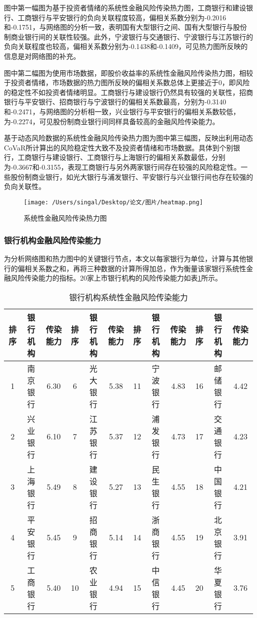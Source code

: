 \documentclass[lang=cn]{elegantpaper}
\begin{document}
图中第一幅图为基于投资者情绪的系统性金融风险传染热力图，工商银行和建设银行、工商银行与平安银行的负向关联程度较高，偏相关系数分别为-0.2016和-0.1751，与网络图的分析一致，表明国有大型银行之间、国有大型银行与股份制商业银行间的关联性较强。此外，宁波银行与交通银行、宁波银行与江苏银行的负向关联程度也较高，偏相关系数分别为-0.1438和-0.1409，可见热力图所反映的信息是对网络图的补充。

图中第二幅图为使用市场数据，即股价收益率的系统性金融风险传染热力图，相较于投资者情绪，市场数据的热力图所反映的偏相关系数总体上更接近于0，即风险的稳定性不如投资者情绪明显。工商银行与建设银行仍然具有较强的关联性，招商银行与平安银行、招商银行与宁波银行的偏相关系数最高，分别为-0.3140和-0.2471，与网络图的分析相一致，兴业银行与平安银行的偏相关系数较低，为-0.2274，可见股份制商业银行间同样具备较高的金融风险传染能力。

基于动态风险数据的系统性金融风险传染热力图为图中第三幅图，反映出利用动态CoVaR所计算出的风险稳定性大致不及投资者情绪和市场数据。具体到个别银行，工商银行与建设银行、工商银行与上海银行的偏相关系数最低，分别为-0.3667和-0.3155，表现工商银行与另外两家银行间存在较强的风险稳定性。一些股份制商业银行，如光大银行与浦发银行、平安银行与兴业银行间也存在较强的负向关联性。

\begin{figure}[H]
    \centering
    \texttt{[image: /Users/singal/Desktop/论文/图片/heatmap.png]}
    \caption{系统性金融风险传染热力图}
    \label{图7}
\end{figure}
\subsubsection{银行机构金融风险传染能力}
为分析网络图和热力图中的关键银行节点，本文以每家银行为单位，计算与其他银行的偏相关系数之和，再将三种数据的计算所得加总，作为衡量该家银行系统性金融风险传染能力的指标。20家上市银行机构的风险传染能力如表\ref{表7}所示。

\setlength{\tabcolsep}{5pt}
\begin{table}[htb]
    \centering
    \caption{银行机构系统性金融风险传染能力}
    \label{表7}
    \begin{tabular}{@{}cccccccccccc@{}}
    \toprule
    排序 & 银行机构 & 传染能力 & 排序 & 银行机构 & 传染能力 & 排序 & 银行机构 & 传染能力 & 排序 & 银行机构 & 传染能力 \\ \midrule
    1  & 南京银行 & 6.30 & 6  & 光大银行 & 5.38 & 11 & 宁波银行 & 4.83 & 16 & 邮储银行 & 4.42 \\
    2  & 兴业银行 & 6.10 & 7  & 江苏银行 & 5.37 & 12 & 浦发银行 & 4.73 & 17 & 交通银行 & 4.23 \\
    3  & 上海银行 & 5.49 & 8  & 建设银行 & 5.27 & 13 & 民生银行 & 4.55 & 18 & 中国银行 & 4.21 \\
    4  & 平安银行 & 5.45 & 9  & 招商银行 & 5.14 & 14 & 浙商银行 & 4.55 & 19 & 北京银行 & 3.91 \\
    5  & 工商银行 & 5.40 & 10 & 农业银行 & 4.94 & 15 & 中信银行 & 4.45 & 20 & 华夏银行 & 3.76 \\ \bottomrule
    \end{tabular}
\end{table}
\end{document}

